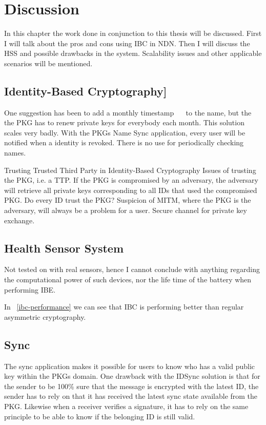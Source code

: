\chapter{Discussion}
In this chapter the work done in conjunction to this thesis will be discussed. 
First I will talk about the pros and cons using \gls{IBC} in \gls{NDN}.
Then I will discuss the \gls{HSS} and possible drawbacks in the system. 
Scalability issues and other applicable scenarios will be mentioned.

\section{Identity-Based Cryptography]}
One suggestion has been to add a monthly timestamp~\cite{DBLP:journals/iacr/BoldyrevaGK12} ~\cite{DBLP:conf/ctrsa/LibertV09}  to the name, but the the \gls{PKG} has to renew private keys for everybody each month. 
This solution scales very badly.
With the \gls{PKG}s Name Sync application, every user will be notified when a identity is revoked.
There is no use for periodically checking names.

Trusting Trusted Third Party in Identity-Based Cryptography
Issues of trusting the \gls{PKG}, i.e. a \gls{TTP}. 
If the \gls{PKG} is compromised by an adversary, the adversary will retrieve all private keys corresponding to all IDs that used the compromised \gls{PKG}. 
Do every ID trust the \gls{PKG}? Suspicion of \gls{MITM}, where the \gls{PKG} is the adversary, will always be a problem for a user.
Secure channel for private key exchange. 

\section{Health Sensor System}
Not tested on with real sensors, hence I cannot conclude with anything regarding the computational power of such devices, nor the life time of the battery when performing \gls{IBE}.  

In ~\autoref{ibc-performance} we can see that \gls{IBC} is performing better than regular asymmetric cryptography. 


\section{Sync}
The sync application makes it possible for users to know who has a valid public key within the \gls{PKG}s domain.
One drawback with the IDSync solution is that for the sender to be 100\% sure that the message is encrypted with the latest \gls{ID}, the sender has to rely on that it has received the latest sync state available from the \gls{PKG}.
Likewise when a receiver verifies a signature, it has to rely on the same principle to be able to know if the belonging \gls{ID} is still valid.

